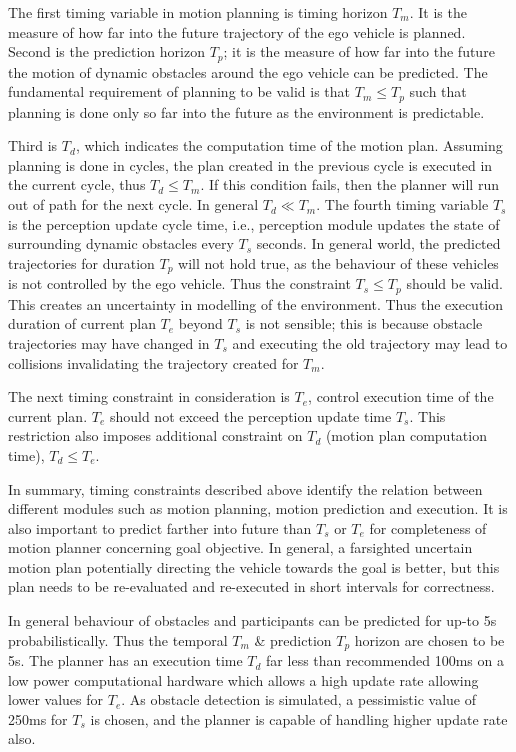 The first timing variable in motion planning is timing horizon $ T_m $. It is the measure of how far into the future trajectory of the ego vehicle is planned. Second is the prediction horizon $ T_p $; it is the measure of how far into the future the motion of dynamic obstacles around the ego vehicle can be predicted. The fundamental requirement of planning to be valid is that $ T_m  \le  T_p $ such that planning is done only so far into the future as the environment is predictable. 

Third is $ T_d $, which indicates the computation time of the motion plan. Assuming planning is done in cycles, the plan created in the previous cycle is executed in the current cycle, thus $ T_d  \le  T_m $. If this condition fails, then the planner will run out of path for the next cycle. In general $ T_d \ll T_m $. The fourth timing variable $ T_s $ is the perception update cycle time, i.e., perception module updates the state of surrounding dynamic obstacles every $ T_s $ seconds. In general world, the predicted trajectories for duration $ T_p $ will not hold true, as the behaviour of these vehicles is not controlled by the ego vehicle. Thus the constraint $ T_s  \le T_p $ should be valid. This creates an uncertainty in modelling of the environment. Thus the execution duration of current plan $ T_e $ beyond $ T_s $ is not sensible; this is because obstacle trajectories may have changed in $ T_s $ and executing the old trajectory may lead to collisions invalidating the trajectory created for $ T_m $. 

The next timing constraint in consideration is $ T_e $, control execution time of the current plan. $ T_e $ should not exceed the perception update time $ T_s $. This restriction also imposes additional constraint on $ T_d $ (motion plan computation time), $ T_d \le T_e $. 

In summary, timing constraints described above identify the relation between different modules such as motion planning, motion prediction and execution. It is also important to predict farther into future than $T_s$ or $T_e$ for completeness of motion planner concerning goal objective. In general, a farsighted uncertain motion plan potentially directing the vehicle towards the goal is better, but this plan needs to be re-evaluated and re-executed in short intervals for correctness. 

In general behaviour of obstacles and participants can be predicted for up-to 5s probabilistically. Thus the temporal $ T_m $ \& prediction $ T_p $ horizon are chosen to be 5s. The planner has an execution time $ T_d $ far less than recommended 100ms on a low power computational hardware which allows a high update rate allowing lower values for $ T_e $. As obstacle detection is simulated, a pessimistic value of 250ms for $ T_s $ is chosen, and the planner is capable of handling higher update rate also. 

